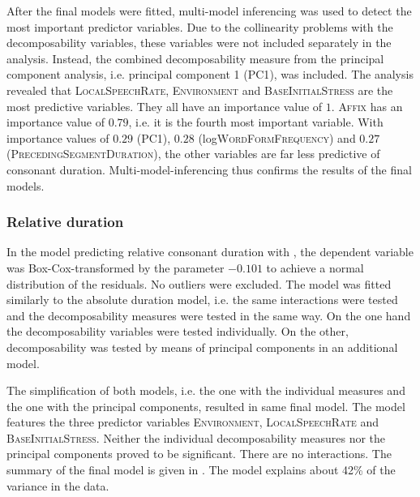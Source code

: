 After the final models were fitted, multi-model inferencing  was used to detect the most important predictor variables. Due to the collinearity problems with the decomposability variables, these variables were not included separately in the analysis. Instead, the combined decomposability measure from the principal component analysis, i.e. principal component 1 (\textsc{PC1}), was included.
The analysis revealed that \textsc{LocalSpeechRate}, \textsc{Environment} and \textsc{BaseInitialStress} are the most predictive variables. They all have an importance value of $1$. \textsc{Affix} has an importance value of $0.79$, i.e. it is the fourth most important variable. With importance values of $0.29$ (\textsc{PC1}), $0.28$ (log\textsc{WordFormFrequency}) and $0.27$ (\textsc{PrecedingSegmentDuration}), the other variables are far less predictive of consonant duration. Multi-model-inferencing thus confirms the results of the final models.


\subsubsection{Relative duration}

In the model predicting relative consonant duration with , the dependent variable was Box-Cox-transformed by the parameter $-0.101$ to achieve a normal distribution of the residuals. No outliers were excluded. The model was fitted similarly to the absolute duration model, i.e. the same interactions were tested and the decomposability measures were tested in the same way. On the one hand the decomposability variables were tested individually. On the other, decomposability was tested by means of principal components in an additional model. 

The simplification of both models, i.e. the one with the individual measures and the one with the principal components, resulted in same final model. The model features the three predictor variables \textsc{Environment}, \textsc{LocalSpeechRate} and \textsc{BaseInitialStress}. Neither the individual decomposability measures nor the principal components proved to be significant. There are no interactions. 
The summary of the final model is given in . The model explains about 42\% of the variance in the data.\\





